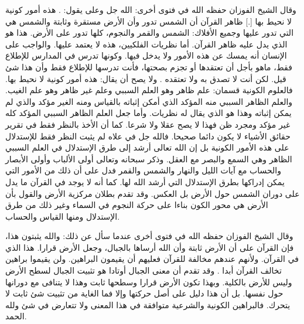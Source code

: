 وقال الشيخ الفوزان حفظه الله في فتوى أخرى: الله جل وعلى يقول: \quranayah*[18][51][1-8] {\footnotesize (\surahname*[18])}. هذه أمور كونية لا نحيط بها [.] ظاهر القرآن أن الشمس تدور وأن الأرض مستقرة وثابتة والشمس هي التي تدور عليها وجميع الأفلاك: الشمس والقمر والنجوم، كلها تدور على الأرض. هذا هو الذي يدل عليه ظاهر القرآن. أما نظريات الفلكيين، هذه لا يعتمد عليها. والواجب على الإنسان أنه يمسك عن هذه الأمور ولا يدخل فيها. وكونها تدرس في المدارس للإطلاع فقط، ماهو بأجل أن تعتقدها أو تجزم بصحتها، فأنت تدرسها للإطلاع فقط وأن هذا شئ قيل. لكن أنت لا تصدق به ولا تعتقده \href{https://www.youtube.com/watch?v=5j5DDjVbGoQ}{\faExternalLink}. ولا يصح أن يقال: هذه أمور كونية لا نحيط بها. فالعلوم الكونية قسمان: علم ظاهر وهو العلم السببي وعلم غير ظاهر وهو علم الغيب. والعلم الظاهر السببي منه المؤكد الذي أمكن إثباته بالقياس ومنه الغير مؤكد والذي لم يمكن إثباته وهذا هو الذي يقال له نظريات. وأما جعل العلم الظاهر السببي المؤكد كله غير مؤكد ومجرد ظن فهذا لا يصح عقلا ولا شرعا. كما أن الأخذ بالنظر فقط في تقرير حقائق الأشياء لا يكون دائما صحيحا. فالله جل في علاه لم يثبت النظر فقط للإستدلال على هذه الأمور الكونية بل إن الله تعالى أرشد إلى طرق الإستدلال في العلم السببي الظاهر وهي السمع والبصر مع العقل. وذكر سبحانه وتعالى أولى الألباب وأولى الأبصار والحساب مع آيات الليل والنهار والشمس والقمر فدل على أن ذلك من الأمور التي يمكن إدراكها بطرق الإستدلال التي أرشد الله لها. كما أنه لا يوجد في القرآن ما يدل على دوران الشمس حول الأرض بل العكس. وقد تقدم بطلان مركزية الأرض والقول بأن الأرض هي محور الكون بناءا على حركة النجوم في السماء وغير ذلك من طرق الإستدلال ومنها القياس والحساب.

وقال الشيخ الفوزان حفظه الله في فتوى أخرى عندما سأل عن ذلك: والله يثبتون هذا، فإن القرآن على أن الأرض ثابتة وأن الله أرساها بالجبال، وجعل الأرض قرارا. هذا الذي في القرآن. ولأنهم عندهم مخالفة للقرآن فعليهم أن يقيمون البراهين. ولن يقيموا براهين تخالف القرآن أبدا \href{https://www.youtube.com/watch?v=ymkzpVhjJhM}{\faExternalLink}. وقد تقدم أن معنى الجبال أوتادا هو تثبيت الجبال لسطح الأرض وليس للأرض بالكلية. وبهذا تكون الأرض قرارا وسطحها ثابت وهذا لا يتنافى مع دورانها حول نفسها. بل أن هذا دليل على أصل حركتها وإلا فما الغاية من تثبيت شئ ثابت لا يتحرك. فالبراهين الكونية والشرعية متوافقة في هذا المعنى ولا تتعارض في شئ ولله الحمد.

